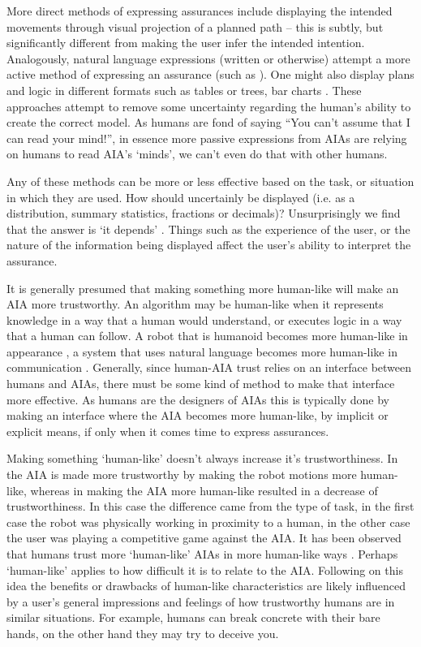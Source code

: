     More direct methods of expressing assurances include displaying the intended movements through visual projection of a planned path \cite{Chadalavada2015-wx} -- this is subtly, but significantly different from making the user infer the intended intention. Analogously, natural language expressions (written or otherwise) attempt a more active method of expressing an assurance (such as \cite{Wang2016-id}). One might also display plans and logic in different formats such as tables or trees, bar charts  \cite{Van_Belle2013-ph, Huysmans2011-th, Hutchins2015-if}. These approaches attempt to remove some uncertainty regarding the human's ability to create the correct model. As humans are fond of saying ``You can't assume that I can read your mind!'', in essence more passive expressions from AIAs are relying on humans to read AIA's `minds', we can't even do that with other humans.

    Any of these methods can be more or less effective based on the task, or situation in which they are used. How should uncertainly be displayed (i.e. as a distribution, summary statistics, fractions or decimals)?  Unsurprisingly we find that the answer is `it depends' \cite{Chen2014-dk,Wallace2001-fm,Kuhn1997-qc,Lacave2002-cu}. Things such as the experience of the user, or the nature of the information being displayed affect the user's ability to interpret the assurance.

    It is generally presumed that making something more human-like will make an AIA more trustworthy. An algorithm may be human-like when it represents knowledge in a way that a human would understand, or executes logic in a way that a human can follow. A robot that is humanoid becomes more human-like in appearance \cite{Bainbridge2011-pl}, a system that uses natural language becomes more human-like in communication \cite{Lacave2002-cu}. Generally, since human-AIA trust relies on an interface between humans and AIAs, there must be some kind of method to make that interface more effective. As humans are the designers of AIAs this is typically done by making an interface where the AIA becomes more human-like, by implicit or explicit means, if only when it comes time to express assurances.

    Making something `human-like' doesn't always increase it's trustworthiness. In \cite{Dragan2013-wd} the AIA is made more trustworthy by making the robot motions more human-like, whereas in \cite{Wu2016-ei} making the AIA more human-like resulted in a decrease of trustworthiness. In this case the difference came from the type of task, in the first case the robot was physically working in proximity to a human, in the other case the user was playing a competitive game against the AIA. It has been observed that humans trust more `human-like' AIAs in more human-like ways \citet{Tripp2011-rx}. Perhaps `human-like' applies to how difficult it is to relate to the AIA. Following on this idea the benefits or drawbacks of human-like characteristics are likely influenced by a user's general impressions and feelings of how trustworthy humans are in similar situations. For example, humans can break concrete with their bare hands, on the other hand they may try to deceive you.

